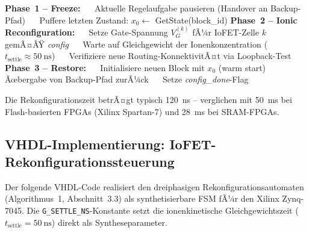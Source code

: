 ﻿\documentclass[a4paper,12pt]{scrreprt}
\theoremstyle{definition}
\begin{document}
\begin{algorithm}[H]
\caption{IoFET-FPGA Rekonfigurationsprotokoll}
\begin{algorithmic}[1]
  \State \textbf{Phase~1 -- Freeze:}
  \State $\quad$ Aktuelle Regelaufgabe pausieren (Handover an Backup-Pfad)
  \State $\quad$ Puffere letzten Zustand: $x_0 \leftarrow$ GetState(block\_id)
  \State \textbf{Phase~2 -- Ionic Reconfiguration:}
  \State $\quad$ Setze Gate-Spannung $V_G^{(k)}$ fÃ¼r IoFET-Zelle $k$ gemÃ¤ÃŸ \textit{config}
  \State $\quad$ Warte auf Gleichgewicht der Ionenkonzentration ($t_{\text{settle}} \approx \SI{50}{\nano\second}$)
  \State $\quad$ Verifiziere neue Routing-KonnektivitÃ¤t via Loopback-Test
  \State \textbf{Phase~3 -- Restore:}
  \State $\quad$ Initialisiere neuen Block mit $x_0$ (warm start)
  \State $\quad$ Ãœbergabe von Backup-Pfad zurÃ¼ck
  \State $\quad$ Setze \textit{config\_done}-Flag
\EndProcedure
\end{algorithmic}
\end{algorithm}

Die Rekonfigurationszeit betrÃ¤gt typisch \SI{120}{\nano\second} --
verglichen mit \SI{50}{\milli\second} bei Flash-basierten FPGAs
(Xilinx Spartan-7) und \SI{28}{\milli\second} bei SRAM-FPGAs.

\subsection{VHDL-Implementierung: IoFET-Rekonfigurationssteuerung}

Der folgende VHDL-Code realisiert den dreiphasigen Rekonfigurationsautomaten
(Algorithmus~1, Abschnitt~3.3) als synthetisierbare FSM fÃ¼r den
Xilinx Zynq-7045. Die \texttt{G\_SETTLE\_NS}-Konstante setzt die
ionenkinetische Gleichgewichtszeit ($t_{\text{settle}} = \SI{50}{\nano\second}$)
direkt als Syntheseparameter.
\end{document}
